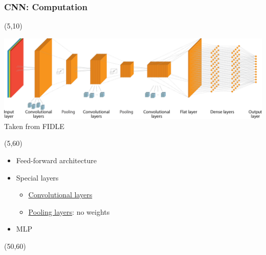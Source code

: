 \begin{frame}[label=CNN_Overview]
  \frametitle{\acl{CNN}: Computation}

  \begin{textblock}{90}(5,10)
    \begin{center}
      \includegraphics[width=\textwidth]{img/CNN.png}
      Taken from FIDLE
    \end{center}
  \end{textblock}

  \begin{textblock}{45}(5,60)
    \begin{itemize}
    \item Feed-forward architecture
    \item Special layers
      \begin{itemize}
      \item<2-> \hyperlink{Convolutional_Layers}{Convolutional layers}
      \item<4-> \hyperlink{Pooling_Layers}{Pooling layers}: no weights
      \end{itemize}
    \item<5-> \ac{MLP}
    \end{itemize}
  \end{textblock}

  \begin{textblock}{45}(50,60)
  \end{textblock}
\end{frame}


